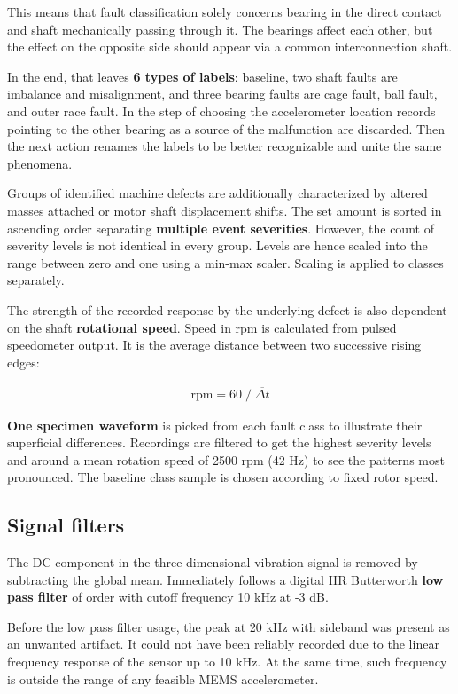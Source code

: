 This means that fault classification solely concerns bearing in the direct contact and shaft mechanically passing through it. The bearings affect each other, but the effect on the opposite side should appear via a common interconnection shaft. 

In the end, that leaves \textbf{6 types of labels}: baseline, two shaft faults are imbalance and misalignment, and three bearing faults are cage fault, ball fault, and outer race fault. In the step of choosing the accelerometer location records pointing to the other bearing as a source of the malfunction are discarded. Then the next action renames the labels to be better recognizable and unite the same phenomena.

Groups of identified machine defects are additionally characterized by altered masses attached or motor shaft displacement shifts. The set amount is sorted in ascending order separating \textbf{multiple event severities}. However, the count of severity levels is not identical in every group. Levels are hence scaled into the range between zero and one using a min-max scaler. Scaling is applied to classes separately.

The strength of the recorded response by the underlying defect is also dependent on the shaft \textbf{rotational speed}. Speed in rpm is calculated from pulsed speedometer output. It is the average distance between two successive rising edges: 
\begin{ceqn}\begin{align}
\mathrm{rpm} = 60 \;/\; \overline{\Delta t}
\end{align}\end{ceqn}

\textbf{One specimen waveform} is picked from each fault class to illustrate their superficial differences. Recordings are filtered to get the highest severity levels and around a mean rotation speed of 2500 rpm (42 Hz)  to see the patterns most pronounced. The baseline class sample is chosen according to fixed rotor speed.


\subsection{Signal filters}
The DC component in the three-dimensional vibration signal is removed by subtracting the global mean. Immediately follows a digital IIR Butterworth \textbf{low pass filter} of  order with cutoff frequency 10 kHz at -3 dB. 

Before the low pass filter usage, the peak at 20 kHz with sideband was present as an unwanted artifact. It could not have been reliably recorded due to the linear frequency response of the sensor up to 10 kHz. At the same time, such frequency is outside the range of any feasible MEMS accelerometer.

